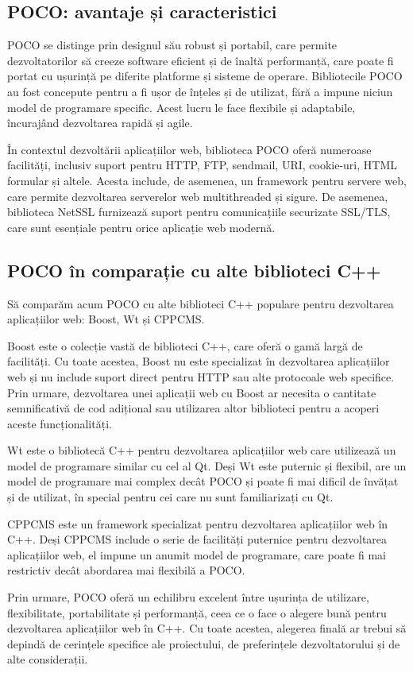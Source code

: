 \subsection{POCO: avantaje și caracteristici}

POCO se distinge prin designul său robust și portabil, care permite dezvoltatorilor să creeze software eficient și de înaltă performanță, care poate fi portat cu ușurință pe diferite platforme și sisteme de operare. Bibliotecile POCO au fost concepute pentru a fi ușor de înțeles și de utilizat, fără a impune niciun model de programare specific. Acest lucru le face flexibile și adaptabile, încurajând dezvoltarea rapidă și agile.

În contextul dezvoltării aplicațiilor web, biblioteca POCO oferă numeroase facilități, inclusiv suport pentru HTTP, FTP, sendmail, URI, cookie-uri, HTML formular și altele. Acesta include, de asemenea, un framework pentru servere web, care permite dezvoltarea serverelor web multithreaded și sigure. De asemenea, biblioteca NetSSL furnizează suport pentru comunicațiile securizate SSL/TLS, care sunt esențiale pentru orice aplicație web modernă.

\subsection{POCO în comparație cu alte biblioteci C++}

Să comparăm acum POCO cu alte biblioteci C++ populare pentru dezvoltarea aplicațiilor web: Boost, Wt și CPPCMS.

Boost este o colecție vastă de biblioteci C++, care oferă o gamă largă de facilități. Cu toate acestea, Boost nu este specializat în dezvoltarea aplicațiilor web și nu include suport direct pentru HTTP sau alte protocoale web specifice. Prin urmare, dezvoltarea unei aplicații web cu Boost ar necesita o cantitate semnificativă de cod adițional sau utilizarea altor biblioteci pentru a acoperi aceste funcționalități.

Wt este o bibliotecă C++ pentru dezvoltarea aplicațiilor web care utilizează un model de programare similar cu cel al Qt. Deși Wt este puternic și flexibil, are un model de programare mai complex decât POCO și poate fi mai dificil de învățat și de utilizat, în special pentru cei care nu sunt familiarizați cu Qt.

CPPCMS este un framework specializat pentru dezvoltarea aplicațiilor web în C++. Deși CPPCMS include o serie de facilități puternice pentru dezvoltarea aplicațiilor web, el impune un anumit model de programare, care poate fi mai restrictiv decât abordarea mai flexibilă a POCO.

Prin urmare, POCO oferă un echilibru excelent între ușurința de utilizare, flexibilitate, portabilitate și performanță, ceea ce o face o alegere bună pentru dezvoltarea aplicațiilor web în C++. Cu toate acestea, alegerea finală ar trebui să depindă de cerințele specifice ale proiectului, de preferințele dezvoltatorului și de alte considerații.